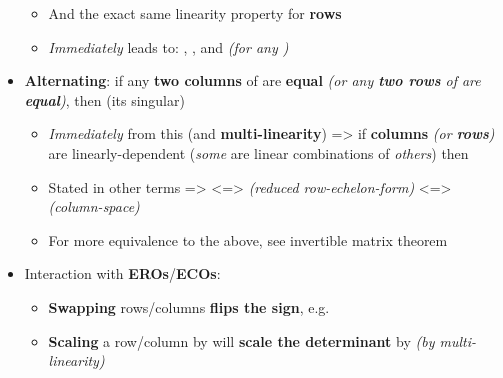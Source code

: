 \begin{itemize}
        \begin{itemize}

          \item
                And the exact same linearity property for \textbf{rows}
          \item
                \emph{Immediately} leads to: ,
                , and 
                \emph{(for any )}
        \end{itemize}
  \item
        \textbf{Alternating}: if any \textbf{two columns} of  are
        \textbf{equal} \emph{(or any \textbf{two rows} of  are
          \textbf{equal})}, then  (its singular)

        \begin{itemize}

          \item
                \emph{Immediately} from this (and \textbf{multi-linearity})
                =\textgreater{} if \textbf{columns} \emph{(or \textbf{rows})} are
                linearly-dependent (\emph{some} are linear combinations of
                \emph{others}) then 
          \item
                Stated in other terms =\textgreater{}
                 \textless=\textgreater{}
                 \emph{(reduced
                  row-echelon-form)} \textless=\textgreater{}
                \emph{(column-space)}
          \item
                For more equivalence to the above, see invertible matrix theorem
        \end{itemize}
  \item
        Interaction with \textbf{EROs}/\textbf{ECOs}:

        \begin{itemize}

          \item
                \textbf{Swapping} rows/columns \textbf{flips the sign},
                e.g.~
          \item
                \textbf{Scaling} a row/column by  will
                \textbf{scale the determinant} by \iMbox{\lambda} \emph{(by
                  multi-linearity)}


\end{itemize}
\end{itemize}
